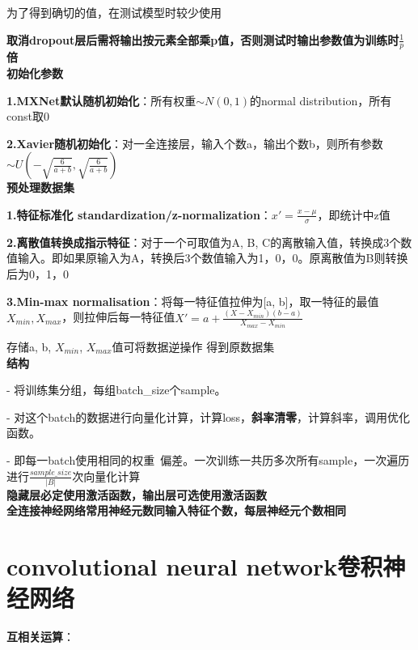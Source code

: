 \documentclass[UTF8]{ctexart}
\begin{document}
  \quad 为了得到确切的值，在测试模型时较少使用
  
  \quad \quad \textbf{取消dropout层后需将输出按元素全部乘p值，否则测试时输出参数值为训练时$\frac{1}{p}$倍}\\
\textbf{初始化参数}

  \textbf{1.MXNet默认随机初始化}：所有权重$\sim N(0, 1)$的normal distribution，所有const取0

  \textbf{2.Xavier随机初始化}：对一全连接层，输入个数a，输出个数b，则所有参数$\sim U(-\sqrt{\frac{6}{a+b}}, \sqrt{\frac{6}{a+b}})$\\
\textbf{预处理数据集}

  \textbf{1.特征标准化 standardization/z-normalization}：$x' = \frac{x - \mu}{\sigma}$，即统计中z值

  \textbf{2.离散值转换成指示特征}：对于一个可取值为A, B, C的离散输入值，转换成3个数值输入。即如果原输入为A，转换后3个数值输入为1，0，0。原离散值为B则转换后为0，1，0
  
  \textbf{3.Min-max normalisation}：将每一特征值拉伸为[a, b]，取一特征的最值$X_{min}, X_{max}$，则拉伸后每一特征值$X' = a + \frac{(X - X_{min})(b - a)}{X_{max} - X_{min}}$
  
  \quad 存储a, b, $X_{min}$, $X_{max}$值可将数据逆操作 得到原数据集\\
\textbf{结构}
  
  - 将训练集分组，每组batch\_size个sample。
  
  - 对这个batch的数据进行向量化计算，计算loss，\textbf{斜率清零}，计算斜率，调用优化函数。

  - 即每一batch使用相同的权重\ 偏差。一次训练一共历多次所有sample，一次遍历进行$\frac{sample\_size}{|B|}$次向量化计算\\
\textbf{隐藏层必定使用激活函数，输出层可选使用激活函数}\\
\textbf{全连接神经网络常用神经元数同输入特征个数，每层神经元个数相同}



\section{convolutional neural network卷积神经网络}
\noindent \textbf{互相关运算}：
\end{document}
